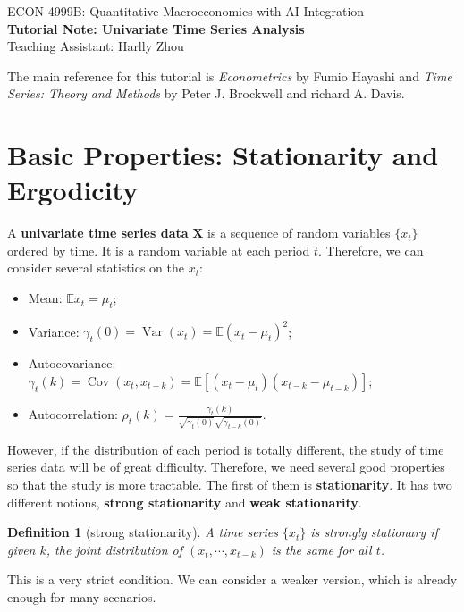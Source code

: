 \documentclass[12pt]{article}
\newtheorem{definition}{Definition}
\begin{document}
\begin{center}
    ECON 4999B: Quantitative Macroeconomics with AI Integration\\
    {\large \textbf{Tutorial Note: Univariate Time Series Analysis}}\\
    Teaching Assistant: Harlly Zhou
\end{center}

The main reference for this tutorial is \textit{Econometrics} by Fumio Hayashi and \textit{Time Series: Theory and Methods} by Peter J. Brockwell and richard A. Davis.

\section{Basic Properties: Stationarity and Ergodicity}
A \textbf{univariate time series data} $\mathbf{X}$ is a sequence of random variables $\{x_t\}$ ordered by time. It is a random variable at each period $t$. Therefore, we can consider several statistics on the $x_t$:
\begin{itemize}
    \item Mean: $\mathbb{E}x_t = \mu_t$;
    \item Variance: $\gamma_t(0) = \operatorname{Var}(x_t) = \mathbb{E}(x_t - \mu_t)^2$;
    \item Autocovariance: $\gamma_t(k) = \operatorname{Cov}(x_t, x_{t-k}) = \mathbb{E} [(x_t - \mu_t)(x_{t-k} - \mu_{t-k})]$;
    \item Autocorrelation: $\rho_t(k) = \frac{\gamma_t(k)}{\sqrt{\gamma_t(0)} \sqrt{\gamma_{t-k}(0)}}$.
\end{itemize}

However, if the distribution of each period is totally different, the study of time series data will be of great difficulty. Therefore, we need several good properties so that the study is more tractable. The first of them is \textbf{stationarity}. It has two different notions, \textbf{strong stationarity} and \textbf{weak stationarity}.

\begin{definition}[strong stationarity]
    A time series $\{x_t\}$ is \emph{strongly stationary} if given $k$, the joint distribution of $(x_t, \cdots, x_{t-k})$ is the same for all $t$. 
\end{definition}
This is a very strict condition. We can consider a weaker version, which is already enough for many scenarios.
\end{document}
